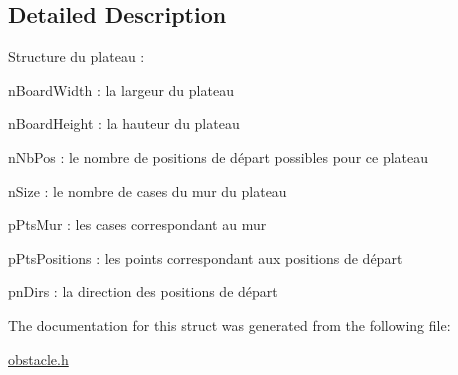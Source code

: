 \subsection{Detailed Description}
Structure du plateau \+:
\begin{DoxyItemize}
\item n\+Board\+Width \+: la largeur du plateau
\item n\+Board\+Height \+: la hauteur du plateau
\item n\+Nb\+Pos \+: le nombre de positions de départ possibles pour ce plateau
\item n\+Size \+: le nombre de cases du mur du plateau
\item p\+Pts\+Mur \+: les cases correspondant au mur
\item p\+Pts\+Positions \+: les points correspondant aux positions de départ
\item pn\+Dirs \+: la direction des positions de départ 
\end{DoxyItemize}

The documentation for this struct was generated from the following file\+:\begin{DoxyCompactItemize}
\item 
\hyperlink{obstacle_8h}{obstacle.\+h}\end{DoxyCompactItemize}

